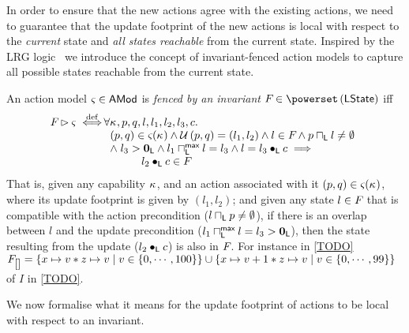 In order to ensure that the new actions agree with the existing actions, we need to guarantee that the update footprint of the new actions is local with respect to the \emph{current} state and \emph{all states reachable} from the current state. Inspired by the LRG logic~\cite{lrg} we introduce the concept of invariant-fenced action models to capture all possible states reachable from the current state.
%
\begin{definition}
An action model $\varsigma_{} \in \textsf{AMod}$ is \emph{fenced by an invariant} $\fence{} \in \pset{\LStates}$ iff
%
\[
\hspace*{-0.15cm}
\begin{array}{l l}
	\fence{} \fences \amod{} \iffdef \hspace*{-0.2cm}
	 &\hspace*{-0.2cm} \for{\ca{}, p, q, l, l_1, l_2, l_3, c}\\
	 
	 & 
	 	(p, q) \in \amod{}(\ca{}) 
	 	\land \updateFP{p, q} = (l_1, l_2) \land
	 	l \in \fence{} \land
	 	p \meetL l \not= \emptyset \\
	 	
	 & 
	 	\land\; l_3 > \unitL \land
	 	 l_1 \maxMeetL l = l_3 \land
	 	 l = l_3 \composeL c
	 	 \implies\\
	 	 
	 & \hspace*{1cm} l_2 \composeL c \in \fence{}	 
\end{array}
\]
%
That is, given any capability $\kappa_{}$, and an action associated with it $(p, q) \in \varsigma_{}(\kappa_{})$, where its update footprint is given by $(l_1, l_2)$; and given any state $l \in F_{}$ that is compatible with the action precondition ($l \sqcap_{\textsf{L}} p \not= \emptyset$), if there is an overlap between $l$ and the update precondition ($l_1 \sqcap_{\textsf{L}}^{\textsf{max}} l = l_3 > \mathbf{0}_{\textsf{L}}$), then the state resulting from the update ($l_2 \bullet_{\textsf{L}} c$) is also in $F_{}$.
For instance in \ex\ref{TODO} $F_{\ref{}} = \left\{x \mapsto v * z \mapsto v \mid v \in \{0, \cdots, 100\} \right\} \cup \left\{x \mapsto v+1 * z \mapsto v \mid v \in \{0 ,\cdots, 99 \}\right\}$ of $I$ in \fig\ref{TODO}.
% 
\end{definition}
%
%
We now formalise what it means for the update footprint of actions to be local with respect to an invariant.
%
